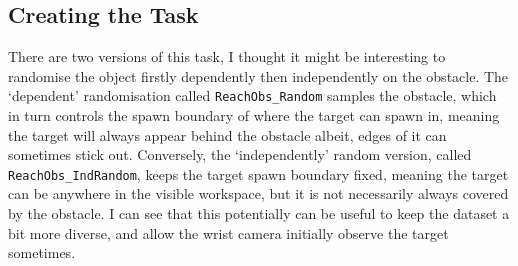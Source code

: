\subsection{Creating the Task}
There are two versions of this task, I thought it might be interesting to randomise the object firstly dependently then independently on the obstacle. The `dependent' randomisation called \verb|ReachObs_Random| samples the obstacle, which in turn controls the spawn boundary of where the target can spawn in, meaning the target will always appear behind the obstacle albeit, edges of it can sometimes stick out. Conversely, the `independently' random version, called \verb|ReachObs_IndRandom|, keeps the target spawn boundary fixed, meaning the target can be anywhere in the visible workspace, but it is not necessarily always covered by the obstacle. I can see that this potentially can be useful to keep the dataset a bit more diverse, and allow the wrist camera initially observe the target sometimes.

